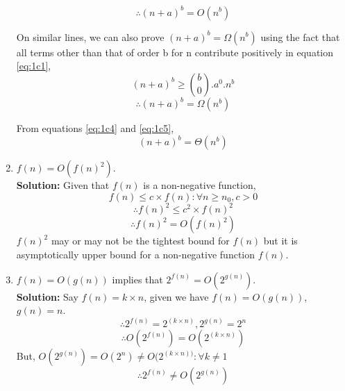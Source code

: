 \documentclass[11pt]{article}
\begin{document}
\begin{enumerate}
	\begin{equation} \label{eq:1c4}
		\boxed{\therefore (n+a)^b = O(n^{b})}
	\end{equation}
	
	On similar lines, we can also prove $(n+a)^b=\Omega(n^b)$ using the fact that all terms other than that of order b for n contribute positively in equation \ref{eq:1c1},
	\begin{equation*}
		(n+a)^b \ge {b \choose 0}.a^0.n^{b}
	\end{equation*}
	\begin{equation} \label{eq:1c5}
		\boxed{\therefore (n+a)^b=\Omega(n^b)}
	\end{equation}
	
	From equations \ref{eq:1c4} and \ref{eq:1c5},
	\begin{equation*}
		\boxed{(n+a)^b=\Theta(n^b)}
	\end{equation*}
	
    \item $f(n)=O(f(n)^2)$. \\
    \textbf{Solution:}
   	Given that $f(n)$ is a non-negative function,
    \begin{equation*}
		f(n) \le  c \times f(n) : \forall n \ge n_0, c > 0
    \end{equation*}
    \begin{equation*}
		\therefore f(n)^2 \le  c^2 \times f(n)^2
	\end{equation*}
	\begin{equation*}
		\boxed{\therefore f(n)^2 =  O(f(n)^2)}
	\end{equation*}
	$f(n)^2$ may or may not be the tightest bound for $f(n)$ but it is asymptotically upper bound for a non-negative function $f(n)$.
	
    \item $f(n)=O(g(n))$ implies that $2^{f(n)}=O(2^{g(n)})$. \\
    \textbf{Solution:}
    Say $f(n)=k \times n$, given we have $f(n)=O(g(n))$, $g(n)=n$. \\
	\begin{equation*}
    \therefore 2^{f(n)} = 2^{(k \times n)}, 2^{g(n)} = 2^n
    \end{equation*}
    \begin{equation*}
    \therefore O(2^{f(n)}) = O(2^{(k \times n)})
    \end{equation*}
    But, $O(2^{g(n)}) = O(2^{n}) \ne O(2^{(k \times n))} :  \forall k \neq 1$
	\begin{equation*}
	    \boxed{\therefore 2^{f(n)} \ne O(2^{g(n)})}
	\end{equation*}

    \end{enumerate}
    
\end{document}
